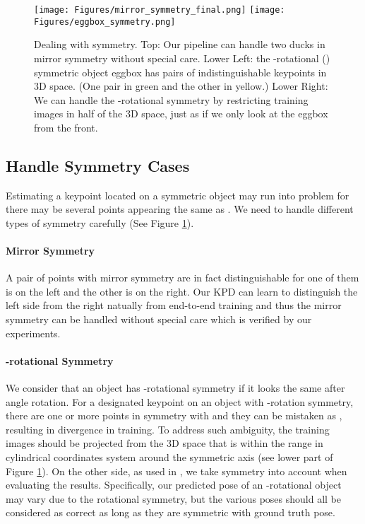 \documentclass[10pt,twocolumn,letterpaper]{article}
\begin{document}
\begin{figure}[t]
\begin{center}
   \texttt{[image: Figures/mirror\_symmetry\_final.png]}
   \texttt{[image: Figures/eggbox\_symmetry.png]}
\end{center}
   \caption{Dealing with symmetry. Top: Our pipeline can handle two ducks in mirror symmetry without special care. Lower Left: the -rotational () symmetric object eggbox has pairs of indistinguishable keypoints in 3D space. (One pair in green and the other in yellow.) Lower Right: We can handle the -rotational symmetry by restricting training images in half of the 3D space, just as if we only look at the eggbox from the front.}
\label{fig:symmetry_explain}
\end{figure}
\subsection{Handle Symmetry Cases}

Estimating a keypoint  located on a symmetric object may run into problem for there may be several points appearing the same as . We need to handle different types of symmetry carefully (See Figure \ref{fig:symmetry_explain}).

\paragraph{Mirror Symmetry} A pair of points with mirror symmetry are in fact distinguishable for one of them is on the left and the other is on the right. Our KPD can learn to distinguish the left side from the right natually from end-to-end training and thus the mirror symmetry can be handled without special care which is verified by our experiments.

\paragraph{-rotational Symmetry} We consider that an object has -rotational symmetry if it looks the same after  angle rotation. For a designated keypoint  on an object with -rotation symmetry, there are one or more points in symmetry with  and they can be mistaken as , resulting in divergence in training. To address such ambiguity, the training images should be projected from the 3D space that is within the range  in cylindrical coordinates system around the symmetric axis (see lower part of Figure \ref{fig:symmetry_explain}). On the other side, as used in \cite{7780735,Hinterstoisser:2012:MBT:2481913.2481959,tekin18}, we take symmetry into account when evaluating the results. Specifically, our predicted pose of an  -rotational object may vary due to the rotational symmetry, but the various poses should all be considered as correct as long as they are symmetric with ground truth pose.
\end{document}
